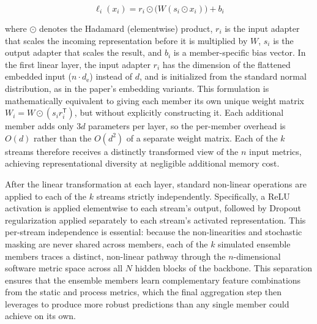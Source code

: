 \begin{equation}
  \ell_i(x_i) = r_i \odot \big(W(s_i \odot x_i)\big) + b_i
  \label{eq:tabm-linear}
\end{equation}

where $\odot$ denotes the Hadamard (elementwise) product, $r_i$ is the input adapter that scales the incoming representation before it is multiplied by $W$, $s_i$ is the output adapter that scales the result, and $b_i$ is a member-specific bias vector. In the first linear layer, the input adapter $r_i$ has the dimension of the flattened embedded input ($n \cdot d_{\mathrm{e}}$) instead of $d$, and is initialized from the standard normal distribution, as in the paper's embedding variants. This formulation is mathematically equivalent to giving each member its own unique weight matrix $W_i = W \odot (s_i r_i^{\mathsf{T}})$, but without explicitly constructing it. Each additional member adds only $3d$ parameters per layer, so the per-member overhead is $O(d)$ rather than the $O(d^2)$ of a separate weight matrix. Each of the $k$ streams therefore receives a distinctly transformed view of the $n$ input metrics, achieving representational diversity at negligible additional memory cost.

After the linear transformation at each layer, standard non-linear operations are applied to each of the $k$ streams strictly independently. Specifically, a ReLU activation is applied elementwise to each stream's output, followed by Dropout regularization applied separately to each stream's activated representation. This per-stream independence is essential: because the non-linearities and stochastic masking are never shared across members, each of the $k$ simulated ensemble members traces a distinct, non-linear pathway through the $n$-dimensional software metric space across all $N$ hidden blocks of the backbone. This separation ensures that the ensemble members learn complementary feature combinations from the static and process metrics, which the final aggregation step then leverages to produce more robust predictions than any single member could achieve on its own.


